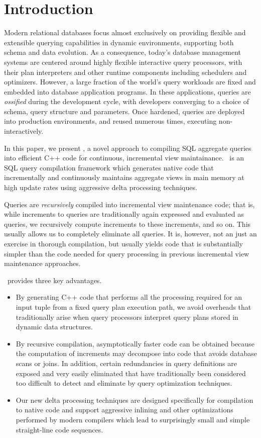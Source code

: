 \section{Introduction}

Modern relational databases focus almost exclusively on providing flexible and
extensible querying capabilities in dynamic environments, supporting both schema
and data evolution.  As a consequence, today's database management systems are
centered around highly flexible interactive query processors, with their plan
interpreters and other runtime components including schedulers and optimizers.
However, a large fraction of the world's query workloads are fixed and embedded
into database application programs. In these applications, queries are
\textit{ossified} during the development cycle, with developers converging to a
choice of schema, query structure and parameters. Once hardened, queries are
deployed into production environments, and re\-used numerous times, executing
non-interactively.

In this paper, we present \compiler, a novel approach to compiling SQL aggregate
queries into efficient C++ code for continuous, incremental view maintainance.
\compiler\ is an SQL query compilation framework which generates native code
that incrementally and continuously maintains aggregate views in main memory at
high update rates using aggressive delta processing techniques.

Queries are {\em recursively}\/ compiled into incremental view maintenance code;
that is, while increments to queries are traditionally again expressed and
evaluated as que\-ries, we recursively compute increments to these increments,
and so on. This usually allows us to completely eliminate all queries.  It is,
however, not an just an exercise in thorough compilation, but usually yields
code that is substantially simpler than the code needed for query processing in
previous incremental view maintenance approaches.

\compiler\ provides three key advantages.
\begin{itemize}
\item By generating C++ code that performs all the processing required for an
input tuple from a fixed query plan execution path, we avoid overheads that
traditionally arise when query processors interpret query plans stored in
dynamic data structures.

\item By recursive compilation, asymptotically faster code can be obtained
because the computation of increments may decompose into code that avoids
database scans or joins.
%
In addition, certain redundancies in query definitions are exposed and very
easily eliminated that have traditionally been considered too difficult to
detect and eliminate by query optimization techniques.

\item Our new delta processing techniques are designed specifically for
compilation to native code and support aggressive inlining and other
optimizations performed by modern compilers which lead to surprisingly small and
simple straight-line code sequences.
\end{itemize}



